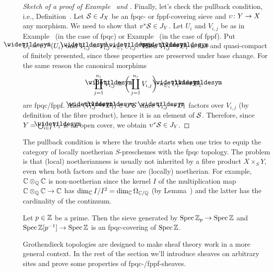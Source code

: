 \documentclass[a4paper,parskip=half,numbers=enddot, DIV=12]{scrreprt}
\begin{document}
\begin{proof}[Sketch of a proof of Example~ and ]
	Finally, let's check the pullback condition, i.e., Definition~. Let $\mathcal{S}\in J_X$ be an fpqc- or fppf-covering sieve and $\upsilon\colon Y\morphism X$ any morphism. We need to show that $v^*\mathcal{S}\in J_Y$. Let $U_i$ and $V_{i,j}$ be as in Example~ (in the case of fpqc) or Example~ (in the case of fppf). Put $\snake{U}_i=\upsilon^{-1}(U_i)$ and $\snake{V}_{i,j}=V_{i,j}\times_{U_i}\snake{U}_{i,j}$. Then $\snake{V}_{i,j}\morphism\snake{U}_i$ is flat and quasi-compact of finitely presented, since these properties are preserved under base change. For the same reason the canonical morphims
	\begin{align*}
		\coprod_{j=1}^{n_i}\snake{V}_{i,j}\cong \bigg(\coprod_{j=1}^{n_i}V_{i,j}\bigg)\times_{U_i}\snake{U}_i\morphism \snake{U}_i
	\end{align*}
	are fpqc/fppf. Also $(\snake{V}_{i,j}\morphism \snake{U}_i)\in\upsilon^*\Ss$ since $\snake{V}_{i,j}\morphism U_i$ factors over $V_{i,j}$ (by definition of the fibre product), hence it is an element of $\mathcal{S}$. Therefore, since $Y=\bigcup_{i\in I}\snake{U}_i$ is an open cover, we obtain $\upsilon^*\mathcal{S}\in J_Y$.
\end{proof}
\begin{rem}
	 The pullback condition is where the trouble starts when one tries to equip the category of locally noetherian $S$-preschemes with the fpqc topology. The problem is that (local) noetherianness is usually not inherited by a fibre product $X\times_SY$, even when both factors and the base are (locally) noetherian. For example, $\mathbb{C}\otimes_{\mathbb{Q}}\mathbb{C}$ is non-noetherian since the kernel $I$ of the multiplication map $\IC\otimes_\IQ\IC\morphism\IC$ has $\dim_{\mathbb{C}} I/I^2=\dim_{\mathbb{C}}\Omega_{\mathbb{C}/\mathbb{Q}}$ (by Lemma~) and the latter has the cardinality of the continuum.
\end{rem}
\begin{example}
	Let $p\in\mathbb{Z}$ be a prime. Then the sieve generated by $\Spec \IZ_p\morphism\Spec\IZ$ and $\Spec\IZ[p^{-1}]\morphism\Spec \IZ$ is an fpqc-covering of $\operatorname{Spec} \mathbb{Z}$.
\end{example}
Grothendieck topologies are designed to make sheaf theory work in a more general context. In the rest of the section we'll introduce sheaves on arbitrary sites and prove some properties of fpqc-/fppf-sheaves.
\end{document}

